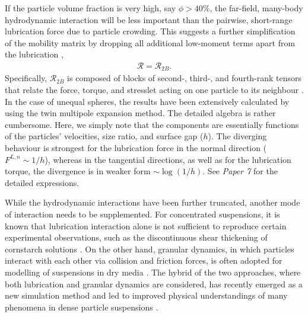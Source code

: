 If the particle volume fraction is very high, say $\phi > 40\%$, the far-field, many-body hydrodynamic interaction will be less important than the pairwise, short-range lubrication force due to particle crowding. This suggests a further simplification of the mobility matrix by dropping all additional low-moment terms apart from the lubrication \citep{Ball_Melrose_1997}, \ie
\begin{equation} 
 \begin{aligned}
  \mathscr{R} = \mathscr{R}_{2B} .
 \end{aligned}
\end{equation}
Specifically, $\mathscr{R}_{2B}$ is composed of blocks of second-, third-, and fourth-rank tensors that relate the force, torque, and stresslet acting on one particle to its neighbour \citep{kim_karrila}.
In the case of unequal spheres, the results have been extensively calculated by \cite{jeffrey_onishi_1984, jeffrey1992} using the twin multipole expansion method.
The detailed algebra is rather cumbersome. Here, we simply note that the components are essentially functions of the particles' velocities, size ratio, and surface gap ($h$). The diverging behaviour is strongest for the lubrication force in the normal direction ($F^{L,n} \sim 1/h$), whereas in the tangential directions, as well as for the lubrication torque, the divergence is in weaker form $\sim \log(1/h)$. See \emph{Paper 7} for the detailed expressions.

While the hydrodynamic interactions have been further truncated, another mode of interaction needs to be supplemented.
For concentrated suspensions, it is known that lubrication interaction alone is not sufficient to reproduce certain experimental observations, such as the discontinuous shear thickening of cornstarch solutions \citep{Morris_annurev2020}.
On the other hand, granular dynamics, in which particles interact with each other via collision and friction forces, is often adopted for modelling of suspensions in dry media \citep{campbell_brennen_1985}.
The hybrid of the two approaches, where both lubrication and granular dynamics are considered, has recently emerged as a new simulation method and led to improved physical understandings of many phenomena in dense particle suspensions \citep{Trulsson_Andreotti_Claudin, Seto_PRL2013, Mari_Seto_2014JoR, Cheal_Ness_2018, Ness_Mari_Cates}.

